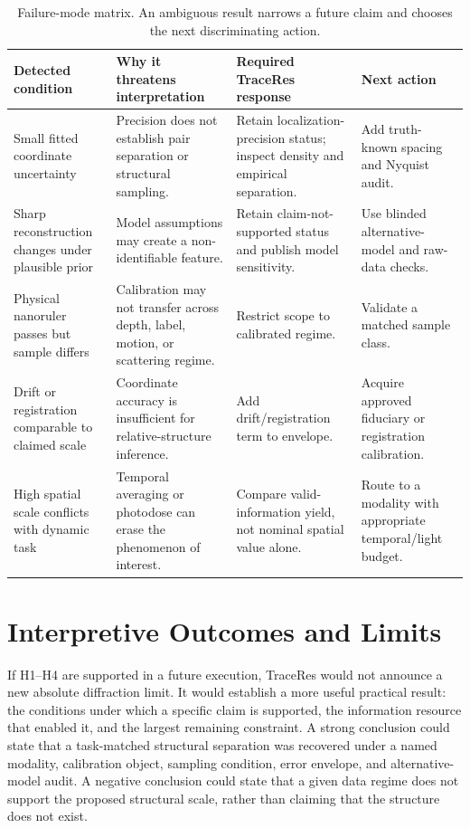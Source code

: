 \documentclass[conference]{IEEEtran}
\begin{document}
\begin{table}[t]
\caption{Failure-mode matrix. An ambiguous result narrows a future claim and chooses the next discriminating action.}
\label{tab:failure}
\centering
\footnotesize
\setlength{\tabcolsep}{3pt}
\begin{tabular}{p{} p{} p{} p{}}
\hline
\textbf{Detected condition} & \textbf{Why it threatens interpretation} & \textbf{Required TraceRes response} & \textbf{Next action}\\
\hline
Small fitted coordinate uncertainty & Precision does not establish pair separation or structural sampling. & Retain localization-precision status; inspect density and empirical separation. & Add truth-known spacing and Nyquist audit.\\
Sharp reconstruction changes under plausible prior & Model assumptions may create a non-identifiable feature. & Retain claim-not-supported status and publish model sensitivity. & Use blinded alternative-model and raw-data checks.\\
Physical nanoruler passes but sample differs & Calibration may not transfer across depth, label, motion, or scattering regime. & Restrict scope to calibrated regime. & Validate a matched sample class.\\
Drift or registration comparable to claimed scale & Coordinate accuracy is insufficient for relative-structure inference. & Add drift/registration term to envelope. & Acquire approved fiduciary or registration calibration.\\
High spatial scale conflicts with dynamic task & Temporal averaging or photodose can erase the phenomenon of interest. & Compare valid-information yield, not nominal spatial value alone. & Route to a modality with appropriate temporal/light budget.\\
\hline
\end{tabular}
\end{table}

\section{Interpretive Outcomes and Limits}

If H1--H4 are supported in a future execution, TraceRes would not announce a new absolute diffraction limit. It would establish a more useful practical result: the conditions under which a specific claim is supported, the information resource that enabled it, and the largest remaining constraint. A strong conclusion could state that a task-matched structural separation was recovered under a named modality, calibration object, sampling condition, error envelope, and alternative-model audit. A negative conclusion could state that a given data regime does not support the proposed structural scale, rather than claiming that the structure does not exist.
\end{document}
